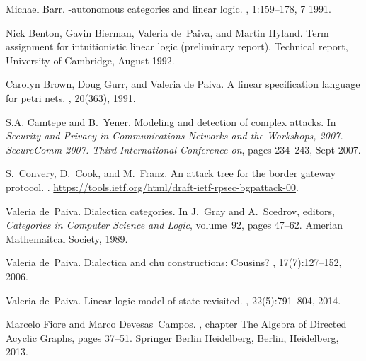 \documentclass{sigplanconf}
\begin{document}
\begin{thebibliography}{10}
  \softraggedright

Michael Barr.
\newblock *-autonomous categories and linear logic.
, 1:159--178, 7
  1991.

Nick Benton, Gavin Bierman, Valeria de~Paiva, and Martin Hyland.
\newblock Term assignment for intuitionistic linear logic (preliminary report).
\newblock Technical report, University of Cambridge, August 1992.  
  
Carolyn Brown, Doug Gurr, and Valeria de Paiva.
\newblock A linear specification language for petri nets.
, 20(363), 1991.

S.A. Camtepe and B.~Yener.
\newblock Modeling and detection of complex attacks.
\newblock In {\em Security and Privacy in Communications Networks and the
  Workshops, 2007. SecureComm 2007. Third International Conference on}, pages
  234--243, Sept 2007.

S.~Convery, D.~Cook, and M.~Franz.
\newblock An attack tree for the border gateway protocol.
.
\newblock \url{https://tools.ietf.org/html/draft-ietf-rpsec-bgpattack-00}.

Valeria de~Paiva.
\newblock Dialectica categories.
\newblock In J.~Gray and A.~Scedrov, editors, {\em Categories in Computer
  Science and Logic}, volume~92, pages 47--62. Amerian Mathemaitcal Society,
  1989.

Valeria de~Paiva.
\newblock Dialectica and chu constructions: Cousins?
, 17(7):127--152, 2006.

Valeria de~Paiva.
\newblock Linear logic model of state revisited.
, 22(5):791--804, 2014.

Marcelo Fiore and Marco Devesas~Campos.
, chapter The Algebra of Directed Acyclic
  Graphs, pages 37--51.
\newblock Springer Berlin Heidelberg, Berlin, Heidelberg, 2013.


\end{thebibliography}
\end{document}
